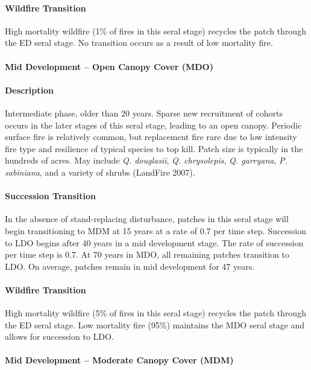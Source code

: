 \paragraph{Wildfire Transition} High mortality wildfire (1\% of fires in this seral stage) recycles the patch through the ED seral stage. No transition occurs as a result of low mortality fire. 

\noindent\hrulefill


\paragraph{Mid Development – Open Canopy Cover (MDO)}

\paragraph{Description} Intermediate phase, older than 20 years. Sparse new recruitment of cohorts occurs in the later stages of this seral stage, leading to an open canopy. Periodic surface fire is relatively common, but replacement fire rare due to low intensity fire type and resilience of typical species to top kill. Patch size is typically in the hundreds of acres. May include \emph{Q. douglasii}, \emph{Q. chrysolepis}, \emph{Q. garryana}, \emph{P. sabiniana}, and a variety of shrubs (LandFire 2007).

\paragraph{Succession Transition} In the absence of stand-replacing disturbance, patches in this seral stage will begin transitioning to MDM at 15 years at a rate of 0.7 per time step. Succession to LDO begins after 40 years in a mid development stage. The rate of succession per time step is 0.7. At 70 years in MDO, all remaining patches transition to LDO. On average, patches remain in mid development for 47 years.

\paragraph{Wildfire Transition} High mortality wildfire (5\% of fires in this seral stage) recycles the patch through the ED seral stage. Low mortality fire (95\%) maintains the MDO seral stage and allows for succession to LDO.

\noindent\hrulefill

\paragraph{Mid Development – Moderate Canopy Cover (MDM)}

